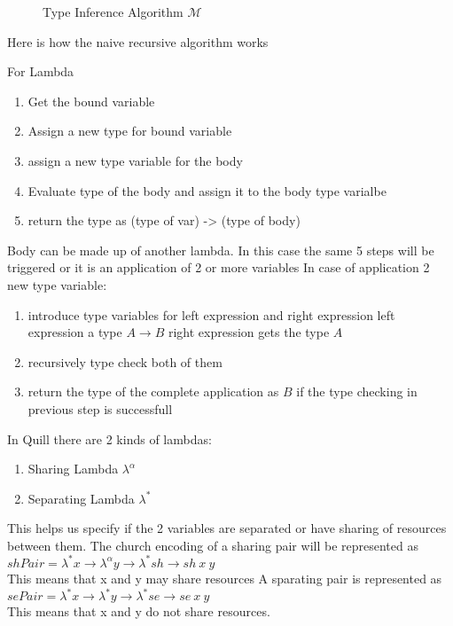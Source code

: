 \begin{figure}[h]
  \begin{framed}
    \begin{minipage}[ht]{1\linewidth}
      \centering
    \end{minipage}
    \begin{minipage}{1\linewidth}
      
    \end{minipage}
  \end{framed}
  \caption{Type Inference Algorithm $\mathcal{M}$}
  \label{fig:algorithm-m}
\end{figure}


Here is how the naive recursive algorithm works

For Lambda
\begin{enumerate}
\item Get the bound variable
\item Assign a new type for bound variable
\item assign a new type variable for the body
\item Evaluate type of the body and assign it to the body type varialbe
\item return the type as (type of var) -> (type of body)
\end{enumerate}

Body can be made up of another lambda. In this case the same 5 steps will be triggered
or it is an application of 2 or more variables
In case of application 2 new type variable:
\begin{enumerate}
\item introduce type variables for left expression and right expression
    left expression a type $A \rightarrow B$ right expression gets the type $A$
\item recursively type check both of them
\item return the type of the complete application as $B$ if the type checking in previous step is successfull
\end{enumerate}


In Quill there are 2 kinds of lambdas:
\begin{enumerate}
\item Sharing Lambda $\lambda^{\alpha}$
\item Separating Lambda $\lambda^{*}$
\end{enumerate}
This helps us specify if the 2 variables are separated or have sharing
of resources between them.
The church encoding of a sharing pair will be represented as\\
$shPair = \lambda^{*} x \rightarrow \lambda^{\alpha} y \rightarrow \lambda^{*} sh \rightarrow sh\ x\ y$\\
This means that x and y may share resources
A sparating pair is represented as\\
$sePair = \lambda^{*} x \rightarrow \lambda^{*}y \rightarrow \lambda^{*}se \rightarrow se\ x\ y$\\
This means that x and y do not share resources.

